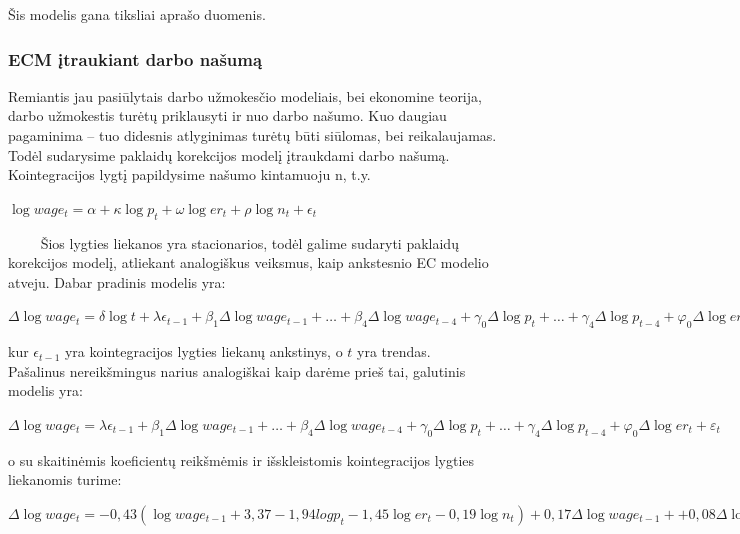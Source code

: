 \documentclass[12pt,a4paper]{article}
\theoremstyle{change}\newtheorem{salyga}{Uždavinys}
\begin{document}
Šis modelis gana tiksliai aprašo duomenis.    





\subsubsection{ECM įtraukiant darbo našumą}
\hspace{40pt}Remiantis jau pasiūlytais darbo užmokesčio modeliais, bei ekonomine teorija, darbo užmokestis turėtų priklausyti ir nuo darbo našumo. Kuo daugiau pagaminima – tuo didesnis atlyginimas turėtų būti siūlomas, bei reikalaujamas. Todėl sudarysime paklaidų korekcijos modelį įtraukdami darbo našumą. 
\vskip 8pt 
$\qquad$Kointegracijos lygtį papildysime našumo kintamuoju n, t.y. 
\vskip 8pt      
\begin{center}
\large$ \log wage_t=\alpha + \kappa\log p_t + \omega\log er_t + \rho\log n_t + \epsilon_t $ 
\end{center} 
\vskip 8pt   
$\qquad$ Šios lygties liekanos yra stacionarios, todėl galime sudaryti paklaidų korekcijos modelį, atliekant analogiškus veiksmus, kaip ankstesnio EC modelio atveju. Dabar pradinis modelis yra:     
     
     
\begin{center}
\large$ \Delta \log wage_t = \delta\log t + \lambda \epsilon_{t-1} + \beta_1\Delta \log wage_{t-1}+ \ldots + \beta_4\Delta \log wage_{t-4}+\gamma_0 \Delta \log p_{t}+\ldots +\gamma_4 \Delta \log p_{t-4}+\varphi_0 \Delta \log er_{t}+\ldots +\varphi_4 \Delta \log er_{t-4}+\psi_0 \Delta \log n_{t}+\ldots +\psi_4 \Delta \log n_{t-4} + \varepsilon_t$  
\end{center}
kur $ \epsilon_{t-1} $ yra kointegracijos lygties liekanų ankstinys, o $ t $ yra trendas.
\vskip 8pt       
$\qquad$Pašalinus nereikšmingus narius analogiškai kaip darėme prieš tai, galutinis modelis yra: 
\begin{center}
\large$ \Delta \log wage_t =  \lambda \epsilon_{t-1} + \beta_1\Delta \log wage_{t-1}+ \ldots + \beta_4\Delta \log wage_{t-4}+\gamma_0 \Delta \log p_{t}+\ldots +\gamma_4 \Delta \log p_{t-4}+\varphi_0 \Delta \log er_{t} + \varepsilon_t$  
\end{center}
  
     
o su skaitinėmis koeficientų reikšmėmis ir išskleistomis kointegracijos lygties liekanomis turime:   



\begin{center}
\large$ \Delta \log wage_t =  -0,43 (\log wage_{t-1}+3,37 - 1,94log p_t - 1,45\log er_t - 0,19\log n_t)  + 0,17\Delta \log wage_{t-1}+ + 0,08\Delta \log wage_{t-2}-0,01\Delta \log wage_{t-3} + 0,60\Delta \log wage_{t-4}+1,86 \Delta \log p_{t}-0,86 \Delta \log p_{t-1}+0,14\Delta \log p_{t-2}+0,55\Delta \log p_{t-3} -1,67 \Delta \log p_{t-4}+0,76 \Delta \log er_{t} + \varepsilon_t$  
\end{center}     
 
\end{document}
